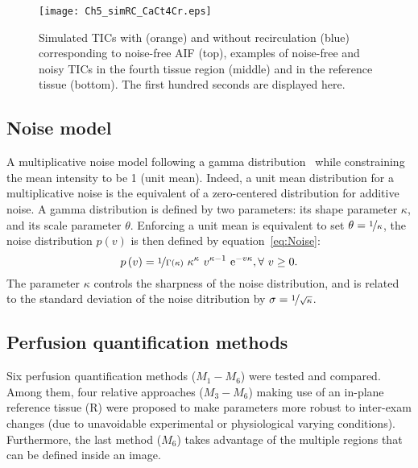 \begin{figure}
\texttt{[image: Ch5\_simRC\_CaCt4Cr.eps]}
\vspace{-5mm}
\caption{Simulated TICs with (orange) and without recirculation (blue) corresponding to noise-free AIF (top), examples of noise-free and noisy TICs in the fourth tissue region (middle) and in the reference tissue (bottom). The first hundred seconds are displayed here.}
\label{fig:recmod}
\vspace{-3mm}
\end{figure}

\subsection{Noise model}
A multiplicative noise model following a gamma distribution~\cite{Barrois2013} while constraining the mean intensity to be 1 (unit mean). Indeed, a unit mean distribution for a multiplicative noise is the equivalent of a zero-centered distribution for additive noise. A gamma distribution is defined by two parameters: its shape parameter $\kappa$, and its scale parameter $\theta$. Enforcing a unit mean is equivalent to set $\theta = \nicefrac{1}{\kappa}$, the noise distribution $p\left(v\right)$ is then defined by equation~\ref{eq:Noise}:
\begin{equation}
p\left(v\right) = \nicefrac{1}{\Gamma\left(\kappa\right)} ~ \kappa^\kappa ~ v^{\kappa-1} ~ \mathrm e^{-v\kappa}, \forall~v \geq 0.
\label{eq:Noise}
\end{equation}
The parameter $\kappa$ controls the sharpness of the noise distribution, and is related to the standard deviation of the noise ditribution by $\sigma = \nicefrac{1}{\sqrt{\kappa}}$.

\subsection{Perfusion quantification methods}
\label{sec:Models}
Six perfusion quantification methods ($M_1-M_6$) were tested and compared. Among them, four relative approaches ($M_3-M_6$) making use of an in-plane reference tissue (R) were proposed to make parameters more robust to inter-exam changes (due to unavoidable experimental or physiological varying conditions). Furthermore, the last method ($M_6$) takes advantage of the multiple regions that can be defined inside an image.

